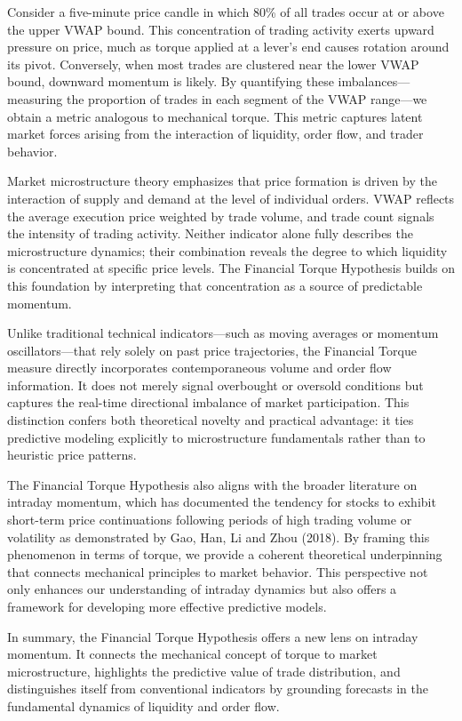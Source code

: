 \documentclass[letterpaper]{article}
\begin{document}
Consider a five-minute price candle in which 80\% of all trades occur at or above the upper VWAP bound. This concentration of trading activity exerts upward pressure on price, much as torque applied at a lever’s end causes rotation around its pivot. Conversely, when most trades are clustered near the lower VWAP bound, downward momentum is likely. By quantifying these imbalances—measuring the proportion of trades in each segment of the VWAP range—we obtain a metric analogous to mechanical torque. This metric captures latent market forces arising from the interaction of liquidity, order flow, and trader behavior.

Market microstructure theory emphasizes that price formation is driven by the interaction of supply and demand at the level of individual orders. VWAP reflects the average execution price weighted by trade volume, and trade count signals the intensity of trading activity. Neither indicator alone fully describes the microstructure dynamics; their combination reveals the degree to which liquidity is concentrated at specific price levels. The Financial Torque Hypothesis builds on this foundation by interpreting that concentration as a source of predictable momentum.

Unlike traditional technical indicators—such as moving averages or momentum oscillators—that rely solely on past price trajectories, the Financial Torque measure directly incorporates contemporaneous volume and order flow information. It does not merely signal overbought or oversold conditions but captures the real-time directional imbalance of market participation. This distinction confers both theoretical novelty and practical advantage: it ties predictive modeling explicitly to microstructure fundamentals rather than to heuristic price patterns.

The Financial Torque Hypothesis also aligns with the broader literature on intraday momentum, which has documented the tendency for stocks to exhibit short-term price continuations following periods of high trading volume or volatility as demonstrated by Gao, Han, Li and Zhou (2018)\cite{gao2018market}. By framing this phenomenon in terms of torque, we provide a coherent theoretical underpinning that connects mechanical principles to market behavior. This perspective not only enhances our understanding of intraday dynamics but also offers a framework for developing more effective predictive models.

In summary, the Financial Torque Hypothesis offers a new lens on intraday momentum. It connects the mechanical concept of torque to market microstructure, highlights the predictive value of trade distribution, and distinguishes itself from conventional indicators by grounding forecasts in the fundamental dynamics of liquidity and order flow.
\end{document}
